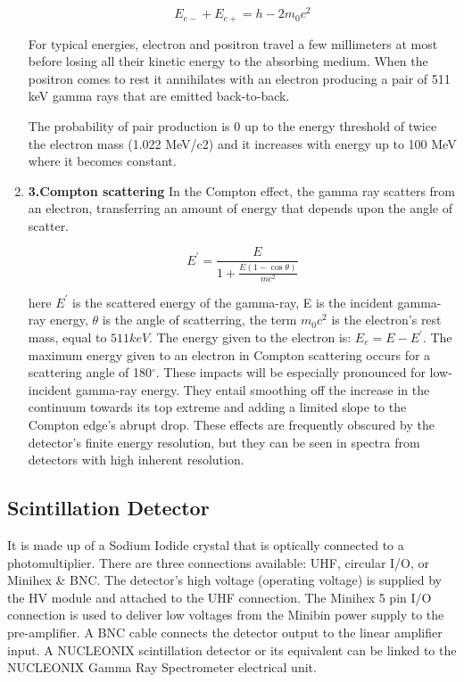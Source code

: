 \begin{enumerate}
			$$E_{e-} + E_{e+} = h - 2m_0c^2$$

			For typical energies, electron and positron travel a few millimeters at most before losing all their kinetic energy to the absorbing medium.  When the positron comes to rest it annihilates with an electron producing a pair of 511 keV gamma rays that are emitted back-to-back.

			The probability of pair production is 0 up to the energy threshold of twice the electron mass (1.022 MeV/c2) and it increases with energy up to 100 MeV where it becomes constant.
		
			\item \textbf{3.Compton scattering} In the Compton effect, the gamma ray scatters from an electron, transferring an amount of energy that depends upon the angle of scatter.

			$$E^{'} = \frac{E}{1+\frac{E(1-\cos\theta)}{mc^2}}$$

			here $E^{'}$ is the scattered energy of the gamma-ray,	E is the incident gamma-ray energy, $\theta$ is the angle of scatterring, the term $m_0c^2$ is the electron's rest mass, equal to $511 keV$. The energy given to the electron is: $E_e=E-E^{'}$. The maximum energy given to an electron in Compton scattering occurs for a scattering angle of 180$^{\circ}$. These impacts will be especially pronounced for low-incident gamma-ray energy. They entail smoothing off the increase in the continuum towards its top extreme and adding a limited slope to the Compton edge's abrupt drop. These effects are frequently obscured by the detector's finite energy resolution, but they can be seen in spectra from detectors with high inherent resolution.
		
		\end{enumerate}

	\subsection{Scintillation Detector}
		It is made up of a Sodium Iodide crystal that is optically connected to a photomultiplier. There are three connections available: UHF, circular I/O, or Minihex \& BNC. The detector's high voltage (operating voltage) is supplied by the HV module and attached to the UHF connection. The Minihex 5 pin I/O connection is used to deliver low voltages from the Minibin power supply to the pre-amplifier. A BNC cable connects the detector output to the linear amplifier input. A NUCLEONIX scintillation detector or its equivalent can be linked to the NUCLEONIX Gamma Ray Spectrometer electrical unit.

